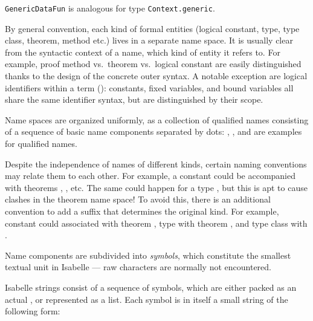 \begin{isabellebody}
\begin{isamarkuptext}
\begin{description}
  \item \verb|GenericDataFun| is analogous for
  type \verb|Context.generic|.

  \end{description}%
\end{isamarkuptext}%
\isamarkuptrue%
%
\endisatagmlref
{\isafoldmlref}%
%
\isadelimmlref
%
\endisadelimmlref
%
\isamarkuptrue%
%
\begin{isamarkuptext}%
By general convention, each kind of formal entities (logical
  constant, type, type class, theorem, method etc.) lives in a
  separate name space.  It is usually clear from the syntactic context
  of a name, which kind of entity it refers to.  For example, proof
  method  vs.\ theorem  vs.\ logical
  constant  are easily distinguished thanks to the design
  of the concrete outer syntax.  A notable exception are logical
  identifiers within a term (): constants, fixed
  variables, and bound variables all share the same identifier syntax,
  but are distinguished by their scope.

  Name spaces are organized uniformly, as a collection of qualified
  names consisting of a sequence of basic name components separated by
  dots: , , and 
  are examples for qualified names.

  Despite the independence of names of different kinds, certain naming
  conventions may relate them to each other.  For example, a constant
   could be accompanied with theorems , ,  etc.  The same
  could happen for a type , but this is apt to cause
  clashes in the theorem name space!  To avoid this, there is an
  additional convention to add a suffix that determines the original
  kind.  For example, constant  could associated with
  theorem , type  with theorem , and type class  with .

  \medskip Name components are subdivided into \emph{symbols}, which
  constitute the smallest textual unit in Isabelle --- raw characters
  are normally not encountered.%
\end{isamarkuptext}%
\isamarkuptrue%
%
\isamarkuptrue%
%
\begin{isamarkuptext}%
Isabelle strings consist of a sequence of
  symbols, which are either packed as
  an actual , or represented as a list.  Each symbol
  is in itself a small string of the following form:


\end{isamarkuptext}
\end{isabellebody}
